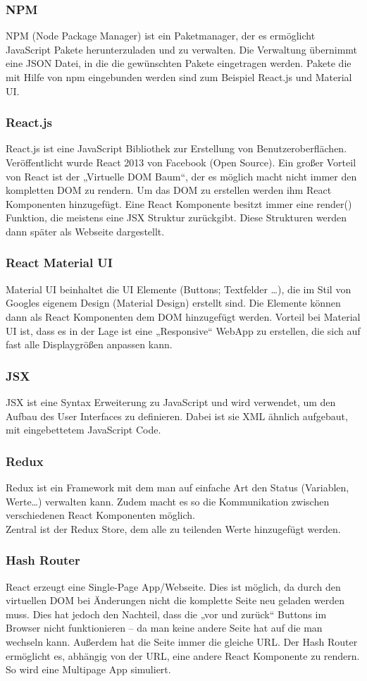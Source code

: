 \documentclass{article}
\begin{document}
		\subsubsection{NPM}
		NPM (Node Package Manager) ist ein Paketmanager, der es ermöglicht JavaScript Pakete herunterzuladen und zu verwalten. Die Verwaltung übernimmt eine JSON Datei, in die die gewünschten Pakete eingetragen werden.
		Pakete die mit Hilfe von npm eingebunden werden sind zum Beispiel React.js und Material UI.
		\subsubsection{React.js}
		React.js ist eine JavaScript Bibliothek zur Erstellung von Benutzeroberflächen. Veröffentlicht wurde React 2013 von Facebook (Open Source). Ein großer Vorteil von React ist der „Virtuelle DOM Baum“, der es möglich macht nicht immer den kompletten DOM zu rendern. Um das DOM zu erstellen werden ihm React Komponenten hinzugefügt.
		Eine React Komponente besitzt immer eine render() Funktion, die meistens eine JSX Struktur zurückgibt. Diese Strukturen werden dann später als Webseite dargestellt.
		\subsubsection{React Material UI}
		Material UI beinhaltet die UI Elemente (Buttons; Textfelder …), die im Stil von Googles eigenem Design (Material Design) erstellt sind. Die Elemente können dann als React Komponenten dem DOM hinzugefügt werden.
		Vorteil bei Material UI ist, dass es in der Lage ist eine „Responsive“ WebApp zu erstellen, die sich auf fast alle Displaygrößen anpassen kann.
		\subsubsection{JSX}
		JSX ist eine Syntax Erweiterung zu JavaScript und wird verwendet, um den Aufbau des User Interfaces zu definieren. Dabei ist sie XML ähnlich aufgebaut, mit eingebettetem JavaScript Code. 
		\subsubsection{Redux}
		Redux ist ein Framework mit dem man auf einfache Art den Status (Variablen, Werte…) verwalten kann. Zudem macht es so die Kommunikation zwischen verschiedenen React Komponenten möglich.\\
		Zentral ist der Redux Store, dem alle zu teilenden Werte hinzugefügt werden.
		\subsubsection{Hash Router}
		React erzeugt eine Single-Page App/Webseite. Dies ist möglich, da durch den virtuellen DOM bei Änderungen nicht die komplette Seite neu geladen werden muss. Dies hat jedoch den Nachteil, dass die „vor und zurück“ Buttons im Browser nicht funktionieren – da man keine andere Seite hat auf die man wechseln kann. Außerdem hat die Seite immer die gleiche URL. 
		Der Hash Router ermöglicht es, abhängig von der URL, eine andere React Komponente zu rendern. So wird eine Multipage App simuliert. 
\end{document}
